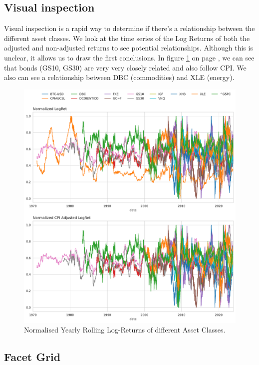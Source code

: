 \documentclass{article}
\begin{document}
\subsection{Visual inspection}

Visual inspection is a rapid way to determine if there's a relationship between the different asset classes. We look at the time series of the Log Returns of both the adjusted and non-adjusted returns to see potential relationships. Although this is unclear, it allows us to draw the first conclusions. In figure \ref{fig:mesh2} on page \pageref{fig:mesh2}, we can see that bonds (GS10, GS30) are very very closely related and also follow CPI. We also can see a relationship between DBC (commodities) and XLE (energy).

\begin{figure}
    \centering
    \includegraphics[width=1\textwidth]{figure/Normalized_Returns.pdf}
    \caption{Normalised Yearly Rolling Log-Returns of different Asset Classes.}
    \label{fig:mesh2}
\end{figure}

\subsection{Facet Grid}
\end{document}
